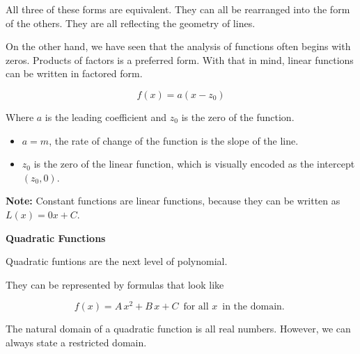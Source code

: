 \documentclass{ximera}
\begin{document}
All three of these forms are equivalent.  They can all be rearranged into the form of the others.  They are all reflecting the geometry of lines.  


On the other hand, we have seen that the analysis of functions often begins with zeros.  Products of factors is a preferred form.  With that in mind, linear functions can be written in factored form.


\[  f(x) = a (x - z_0)  \]

Where $a$ is the leading coefficient and $z_0$ is the zero of the function.





\begin{itemize}

\item $a = m$, the rate of change of the function is the slope of the line.

\item $z_0$ is the zero of the linear function, which is visually encoded as the intercept $(z_0, 0)$.

\end{itemize}



\textbf{Note:} Constant functions are linear functions, because they can be written as $L(x) = 0 x + C$. \\












\begin{template}  \textbf{\textcolor{blue!55!black}{Quadratic Functions}} 



Quadratic funtions are the next level of polynomial. 


They can be represented by formulas that look like


\[ f(x) = A \, x^2 + B \, x + C  \,  \text{ for all } x  \, \text{ in the domain. }   \]



\end{template}



The natural domain of a quadratic function is all real numbers.  However, we can always state a restricted domain.
\end{document}
